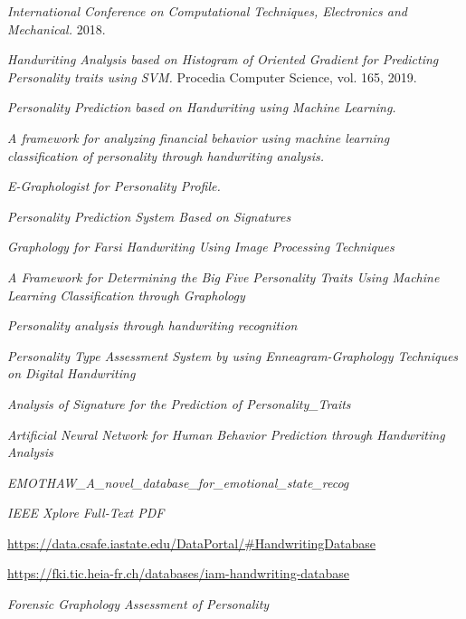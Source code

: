 \documentclass[10pt, a4paper]{article}
\begin{document}
\begin{thebibliography}{99}
         \emph{International Conference on Computational Techniques, Electronics and Mechanical.} 2018. 
    
         \emph{Handwriting Analysis based on Histogram of Oriented Gradient for Predicting Personality traits using SVM.} Procedia Computer Science, vol. 165, 2019.
    
         \emph{Personality Prediction based on Handwriting using Machine Learning.}
        
         \emph{A framework for analyzing financial behavior using machine learning classification of personality through handwriting analysis.}
    
         \emph{E-Graphologist for Personality Profile.}

          \emph{Personality Prediction System Based on Signatures}
        
          \emph{Graphology for Farsi Handwriting Using Image Processing Techniques    }
        
          \emph{A Framework for Determining the Big Five Personality Traits Using Machine Learning Classification through Graphology}
        
          \emph{Personality analysis through handwriting recognition}
        
         \emph{Personality Type Assessment System by using  Enneagram-Graphology Techniques on Digital  Handwriting}
        
         \emph{Analysis of Signature for the Prediction of Personality\_Traits}
        
         \emph{Artificial Neural Network for Human Behavior Prediction  through Handwriting Analysis}
        
         \emph{EMOTHAW\_A\_novel\_database\_for\_emotional\_state\_recog}
        
         \emph{IEEE Xplore Full-Text PDF}
        
         \url{https://data.csafe.iastate.edu/DataPortal/#HandwritingDatabase} 
        
         \url{https://fki.tic.heia-fr.ch/databases/iam-handwriting-database} 

         \emph{Forensic Graphology Assessment of Personality}


\end{thebibliography}
\end{document}

